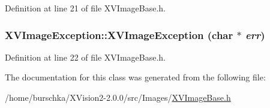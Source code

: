 Definition at line 21 of file XVImage\-Base.h.\label{XVImageException_a1}
\hypertarget{class_XVImageException_a1}{
\subsubsection[XVImageException]{\setlength{\rightskip}{0pt plus 5cm}XVImage\-Exception::XVImage\-Exception (char $\ast$ {\em err})}}




Definition at line 22 of file XVImage\-Base.h.

The documentation for this class was generated from the following file:\begin{CompactItemize}
\item 
/home/burschka/XVision2-2.0.0/src/Images/\hyperlink{XVImageBase.h-source}{XVImage\-Base.h}\end{CompactItemize}
